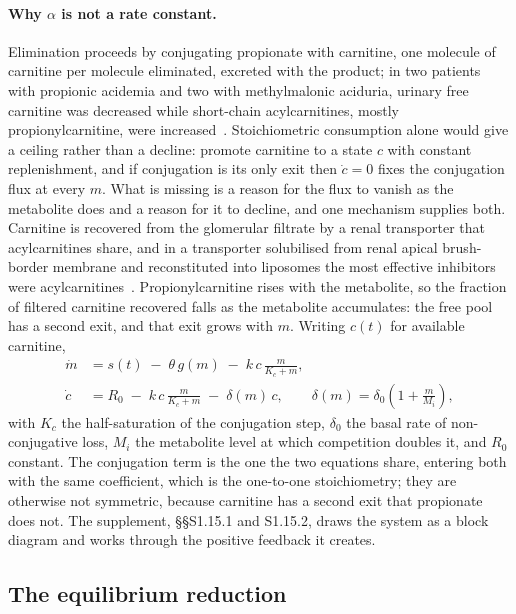 \paragraph{Why $\alpha$ is not a rate constant.} Elimination proceeds by conjugating
propionate with carnitine, one molecule of carnitine per molecule eliminated, excreted
with the product; in two patients with propionic acidemia and two with methylmalonic
aciduria, urinary free carnitine was decreased while short-chain acylcarnitines, mostly
propionylcarnitine, were increased~\cite{carnitine_excretion_pa}. %
Stoichiometric consumption alone would give a ceiling rather than a decline: promote
carnitine to a state $c$ with constant replenishment, and if conjugation is its only exit
then $\dot c = 0$ fixes the conjugation flux at every $m$. What is missing is a reason for
the flux to vanish as the metabolite does and a reason for it to decline, and one mechanism
supplies both. Carnitine is recovered from the glomerular filtrate by a renal transporter
that acylcarnitines share, and in a transporter solubilised from renal apical brush-border
membrane and reconstituted into liposomes the most effective inhibitors were
acylcarnitines~\cite{octn2_renal_transport}. %
Propionylcarnitine rises with the metabolite, so the fraction of filtered carnitine
recovered falls as the metabolite accumulates: the free pool has a second exit, and that
exit grows with $m$. Writing $c(t)$ for available carnitine,
\begin{equation}
\begin{aligned}
\dot m &= s(t) \;-\; \theta\, g(m) \;-\; k\, c\, \frac{m}{K_c + m}, \\[2pt]
\dot c &= R_0 \;-\; k\, c\, \frac{m}{K_c + m} \;-\; \delta(m)\, c,
\qquad \delta(m) = \delta_0\left(1 + \frac{m}{M_i}\right),
\end{aligned}
\label{eq:twostate}
\end{equation}
with $K_c$ the half-saturation of the conjugation step, $\delta_0$ the basal rate of
non-conjugative loss, $M_i$ the metabolite level at which competition doubles it, and $R_0$
constant. The conjugation term is the one the two equations share, entering both with the
same coefficient, which is the one-to-one stoichiometry; they are otherwise not symmetric,
because carnitine has a second exit that propionate does not. The supplement,
\S\S S1.15.1 and S1.15.2, draws the system as a block diagram and works through the
positive feedback it creates.

\subsection{The equilibrium reduction}
\label{sec:reduction}

